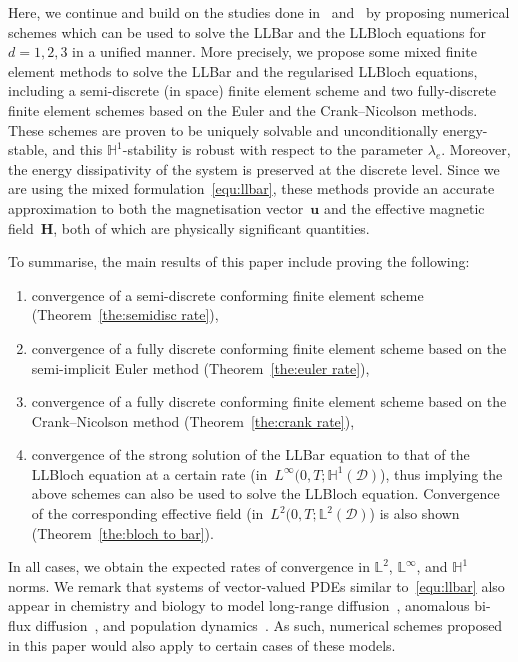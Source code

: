 \documentclass[11pt, reqno]{amsart}
\theoremstyle{definition}
\theoremstyle{remark}
\numberwithin{equation}{section}
\newcommand{\bff}{\boldsymbol}
\newcommand{\bb}{\mathbb}
\begin{document}
\par \medskip

Here, we continue and build on the studies done in~\cite{SoeTra23b} and~\cite{LeSoeTra24} by proposing numerical schemes which can be used to solve the LLBar and the LLBloch equations for $d=1,2,3$ in a unified manner. More precisely, we propose some mixed finite element methods to solve the LLBar and the regularised LLBloch equations, including a semi-discrete (in space) finite element scheme and two fully-discrete finite element schemes based on the Euler and the Crank--Nicolson methods. These schemes are proven to be uniquely solvable and unconditionally energy-stable, and this $\bb{H}^1$-stability is robust with respect to the parameter $\lambda_e$. Moreover, the energy dissipativity of the system is preserved at the discrete level. Since we are using the mixed formulation~\eqref{equ:llbar}, these methods provide an accurate approximation to both the magnetisation vector~$\bff{u}$ and the effective magnetic field~$\bff{H}$, both of which are physically significant quantities.

\par \medskip

To summarise, the main results of this paper include proving the following:
\begin{enumerate}
	\item convergence of a semi-discrete conforming finite element scheme (Theorem~\ref{the:semidisc rate}),
	\item convergence of a fully discrete conforming finite element scheme based on the semi-implicit Euler method (Theorem~\ref{the:euler rate}),
	\item convergence of a fully discrete conforming finite element scheme based on the Crank--Nicolson method (Theorem~\ref{the:crank rate}),
	\item convergence of the strong solution of the LLBar equation to that of the LLBloch equation at a certain rate (in~$L^\infty(0,T;\bb{H}^1(\mathscr{D})$), thus implying the above schemes can also be used to solve the LLBloch equation. Convergence of the corresponding effective field (in~$L^2(0,T;\bb{L}^2(\mathscr{D})$) is also shown (Theorem~\ref{the:bloch to bar}).
\end{enumerate}
In all cases, we obtain the expected rates of convergence in $\bb{L}^2$, $\bb{L}^\infty$, and $\bb{H}^1$ norms. We remark that systems of vector-valued PDEs similar to~\eqref{equ:llbar} also appear in chemistry and biology to model long-range diffusion~\cite[Chapter 11]{Mur02}, anomalous bi-flux diffusion~\cite{BevGalSimRio13, JiaBevZhu20}, and population dynamics~\cite{CocDi23, CohMur81, Och84}. As such, numerical schemes proposed in this paper would also apply to certain cases of these models.
\end{document}

